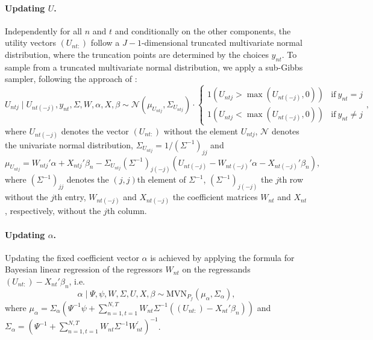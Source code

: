 \documentclass[article]{jss}
\begin{document}
\paragraph{Updating $U$.} Independently for all $n$ and $t$ and conditionally on the other components, the utility vectors $(U_{nt:})$ follow a $J-1$-dimensional truncated multivariate normal distribution, where the truncation points are determined by the choices $y_{nt}$. To sample from a truncated multivariate normal distribution, we apply a sub-Gibbs sampler, following the approach of \cite{Geweke:98}:
\begin{equation}
U_{ntj} \mid U_{nt(-j)},y_{nt},\Sigma,W,\alpha,X,\beta
\sim \mathcal{N}(\mu_{U_{ntj}},\Sigma_{U_{ntj}}) \cdot \begin{cases}
1(U_{ntj}>\max(U_{nt(-j)},0) ) & \text{if}~ y_{nt}=j\\
1(U_{ntj}<\max(U_{nt(-j)},0) ) & \text{if}~ y_{nt}\neq j
\end{cases},
\end{equation}
where $U_{nt(-j)}$ denotes the vector $(U_{nt:})$ without the element $U_{ntj}$, $\mathcal{N}$ denotes the univariate normal distribution, $\Sigma_{U_{ntj}} = 1/(\Sigma^{-1})_{jj}$ and
\begin{equation}
\mu_{U_{ntj}} = W_{ntj}'\alpha + X_{ntj}'\beta_n - \Sigma_{U_{ntj}} (\Sigma^{-1})_{j(-j)}   (U_{nt(-j)} - W_{nt(-j)}'\alpha - X_{nt(-j)}' \beta_n ),
\end{equation}
where $(\Sigma^{-1})_{jj}$ denotes the $(j,j)$th element of $\Sigma^{-1}$, $(\Sigma^{-1})_{j(-j)}$ the $j$th row without the $j$th entry, $W_{nt(-j)}$ and $X_{nt(-j)}$ the coefficient matrices $W_{nt}$ and $X_{nt}$, respectively, without the $j$th column.

\paragraph{Updating $\alpha$.} Updating the fixed coefficient vector $\alpha$ is achieved by applying the formula for Bayesian linear regression of the regressors $W_{nt}$ on the regressands $(U_{nt:})-X_{nt}'\beta_n$, i.e.
\begin{equation}
\alpha \mid \Psi,\psi,W,\Sigma,U,X,\beta \sim \text{MVN}_{P_f}(\mu_\alpha,\Sigma_\alpha),
\end{equation}
where $\mu_\alpha = \Sigma_\alpha (\Psi^{-1}\psi + \sum_{n=1,t=1}^{N,T} W_{nt} \Sigma^{-1} ((U_{nt:})-X_{nt}'\beta_n) )$ and $\Sigma_\alpha = (\Psi^{-1} + \sum_{n=1,t=1}^{N,T} W_{nt}\Sigma^{-1} W_{nt}^{'} )^{-1}$.
\end{document}
